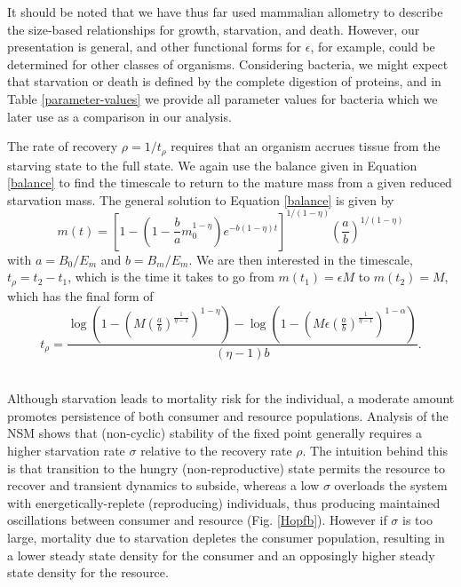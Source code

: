 \documentclass[12pt,english]{article}
\begin{document}
\begin{spacing}{1.9}
It should be noted that we have thus far used mammalian allometry to describe the size-based relationships for growth, starvation, and death. However, our presentation is general, and other functional forms for $\epsilon$, for example, could be determined for other classes of organisms. Considering bacteria, we might expect that starvation or death is defined by the complete digestion of proteins, and in Table \ref{parameter-values} we provide all parameter values for bacteria which we later use as a comparison in our analysis. 

The rate of recovery $\rho = 1/t_\rho$ requires that an organism accrues tissue from the starving state to the full state.
We again use the balance given in Equation \ref{balance} to find the timescale to return to the mature mass from a given reduced starvation mass. The general solution to Equation \ref{balance} is given by
\begin{equation}
m\left(t\right)=\left[1-\left(1-\frac{b}{a}m_{0}^{1-\eta}\right)e^{-b\left(1-\eta\right)t}\right]^{1/\left(1-\eta\right)}\left(\frac{a}{b}\right)^{1/\left(1-\eta\right)}
\end{equation}
with $a=B_{0}/E_{m}$ and $b=B_{m}/E_{m}$. We are then interested in the timescale, $t_{\rho}=t_{2}-t_{1}$, which is the time it takes to go from $m\left(t_{1}\right)=\epsilon M$ to $m\left(t_{2}\right)=M$, which has the final form of 
\begin{equation}
t_{\rho}=\frac{\log \left(1-\left(M \left(\frac{a}{b}\right)^{\frac{1}{\eta -1}}\right)^{1-\eta }\right)-\log \left(1-\left(M \epsilon  \left(\frac{a}{b}\right)^{\frac{1}{\eta
   -1}}\right)^{1-\alpha }\right)}{(\eta -1) b}.
\end{equation}








 \\ \noindent
Although starvation leads to mortality risk for the individual, a moderate amount promotes persistence of both consumer and resource populations.
Analysis of the NSM shows that (non-cyclic) stability of the fixed point generally requires a higher starvation rate $\sigma$ relative to the recovery rate $\rho$.
The intuition behind this is that transition to the hungry (non-reproductive) state permits the resource to recover and transient dynamics to subside, whereas a low $\sigma$ overloads the system with energetically-replete (reproducing) individuals, thus producing maintained oscillations between consumer and resource (Fig. \ref{Hopfb}).
However if $\sigma$ is too large, mortality due to starvation depletes the consumer population, resulting in a lower steady state density for the consumer and an opposingly higher steady state density for the resource.


\end{spacing}
\end{document}
